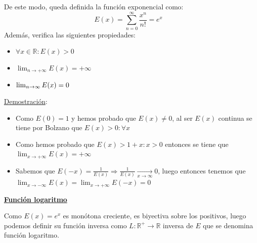 \documentclass[10pt,a4paper,openright]{book}
\begin{document}
De este modo, queda definida la función exponencial como:
$$E(x) = \sum_{n=0}^{\infty} \frac{x^n}{n!} = e^x$$
Además, verifica las siguientes propiedades:
\begin{itemize}
\item $\forall x \in \mathbb R: E(x) > 0$
\item $\lim_{n \to +\infty} E(x) = + \infty$
\item $\lim_{n \to \-\infty} E(x) = 0$
\end{itemize}
\underline{Demostración}:
\begin{itemize}
\item Como $E(0) = 1$ y hemos probado que $E(x) \neq 0$, al ser $E(x)$ continua se tiene por Bolzano que $E(x) > 0 : \forall x $
\item Como hemos probado que $E(x) > 1 + x : x > 0$ entonces se tiene que $\lim_{x \to +\infty} E(x) = + \infty$

\item Sabemos que $ E(-x) = \frac{1}{E(x)} \Rightarrow \frac{1}{E(x)} \underset{x \to \infty}{\longrightarrow} 0$, luego entonces tenemos que $\lim_{x \to -\infty} E(x) = \lim_{x \to +\infty} E(-x) = 0$
\end{itemize}

\underline{\textbf{Función logaritmo}}

Como $E(x) = e^x$ es monótona creciente, es biyectiva sobre los positivos, luego podemos definir su función inversa como $L: \mathbb{R}^+ \to \mathbb{R}$ inversa de $E$ que se denomina función logaritmo.
\end{document}
